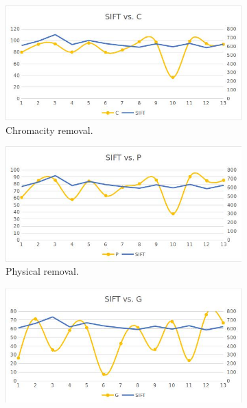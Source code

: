 \documentclass[12pt]{report}
\begin{document}
\begin{figure}
\centering
\begin{subfigure}{.49\linewidth}
 \includegraphics[width=1\linewidth]{figures/selectinganalgorithm_chromacity.jpg}
  \caption{Chromacity removal.}
\end{subfigure}
\hfill
\begin{subfigure}{.49\linewidth}
 \includegraphics[width=1\linewidth]{figures/selectinganalgorithm_physical.jpg}
  \caption{Physical removal.}
\end{subfigure}
\hfill
\begin{subfigure}{.49\linewidth}
 \includegraphics[width=1\linewidth]{figures/selectinganalgorithm_geometry.jpg}

\end{subfigure}
\end{figure}
\end{document}
